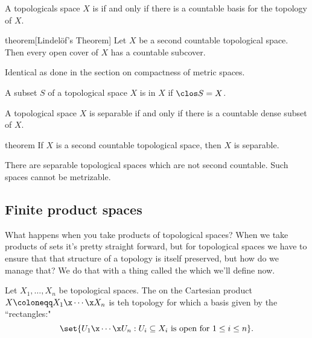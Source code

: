 \documentclass[class=article, crop=false]{standalone}
\begin{document}
\begin{defn}
  A topologicals space $X$ is  if and only if there is a countable basis for the topology of $X$.
\end{defn}

\begin{result}{theorem}[Lindel\"{o}f's Theorem]
  Let $X$ be a second countable topological space. Then every open cover of $X$ has a countable subcover.
\end{result}

\begin{pf}
  Identical as done in the section on compactness of metric spaces.
\end{pf}

\begin{defn}[Dense]
  A subset $S$ of a topological space $X$ is  in $X$ if $\clos S = X$.
\end{defn}

\begin{defn}[Separable]
  A topological space $X$ is separable if and only if there is a countable dense subset of $X$.
\end{defn}

\begin{result}{theorem}
  If $X$ is a second countable topological space, then $X$ is separable.
\end{result}

\begin{rem}
  There are separable topological spaces which are not second countable. Such spaces cannot be metrizable.
\end{rem}










\subsection{Finite product spaces}

What happens when you take products of topological spaces? When we take products of sets it's pretty straight forward, but for topological spaces we have to ensure that that structure of a topology is itself preserved, but how do we manage that? We do that with a thing called the  which we'll define now.

\begin{defn}
  Let $X_1, \ldots, X_n$ be topological spaces. The  on the Cartesian product $X \coloneqq X_1 \x \cdots \x X_n$ is teh topology for which a basis given by the ``rectangles:"
    \[
      \set{U_1 \x \cdots \x U_n : U_i \subseteq X_i \text{ is open for } 1 \leq i \leq n}.
    \]
\end{defn}
\end{document}
